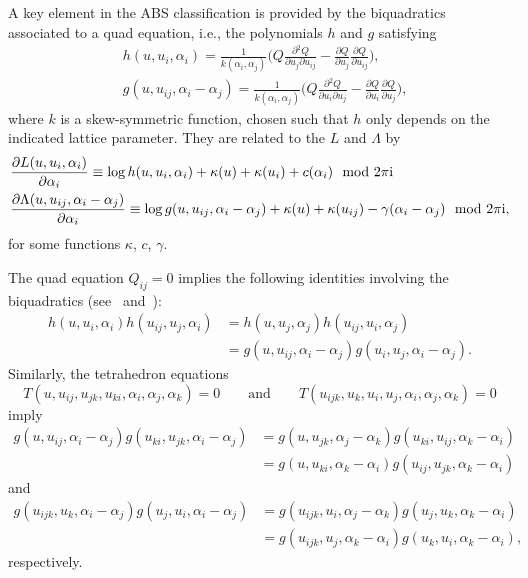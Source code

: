 \documentclass[pdftex]{sigma}
\newcommand{\pdv}[2]{\frac{\partial {#1}}{\partial {#2}}}
\numberwithin{equation}{section}
\begin{document}
A key element in the ABS classification is provided by the biquadratics associated to a quad equation, i.e., the polynomials $h$ and $g$ satisfying
 \begin{align*}
 & h(u,u_i,\alpha_i)= \frac{1}{k(\alpha_i,\alpha_j)} \biggl( Q \pdv{^2 Q}{u_j \partial u_{ij}} - \pdv{Q}{u_j}\pdv{Q}{u_{ij}} \biggr) , \\
 & g(u,u_{ij},\alpha_i-\alpha_j)= \frac{1}{k(\alpha_i,\alpha_j)} \biggl( Q \pdv{^2 Q}{u_i \partial u_j} - \pdv{Q}{u_i}\pdv{Q}{u_j} \biggr) ,
 \end{align*}
 where $k$ is a skew-symmetric function, chosen such that $h$ only depends on the indicated lattice parameter. They are related to the $L$ and $\Lambda$ by
\cite[Lemma 3]{bobenko2010lagrangian}{\samepage
 \begin{align}
	 &\pdv{L(u,u_i,\alpha_i)}{\alpha_i}\equiv \log h(u,u_i,\alpha_i) + \kappa(u) + \kappa(u_i) + c(\alpha_i) \mod 2 \pi {\rm i} \label{L-log(h)}\\
	 &\pdv{\Lambda(u,u_{ij},\alpha_i-\alpha_j)}{\alpha_i}\equiv \log g(u,u_{ij},\alpha_i-\alpha_j) + \kappa(u) + \kappa(u_{ij}) - \gamma(\alpha_i-\alpha_j) \mod 2 \pi {\rm i} , \label{Lambda-log(g)}
 \end{align}
 for some functions $\kappa$, $c$, $\gamma$.}

The quad equation $Q_{ij} = 0$ implies the following identities involving the biquadratics (see~\cite[Lemma 1]{bobenko2010lagrangian} and~\cite[Proposition 15]{adler2003classification}):
\begin{align}
	h(u,u_i,\alpha_i)h(u_{ij},u_j,\alpha_i)
 &= h(u,u_j,\alpha_j)h(u_{ij},u_i,\alpha_j) \nonumber \\
 &= g(u,u_{ij},\alpha_i-\alpha_j)g(u_i,u_j,\alpha_i-\alpha_j) .\label{biquadratric-quad}
\end{align}
Similarly, the tetrahedron equations
\[ T(u,u_{ij},u_{jk},u_{ki},\alpha_i,\alpha_j,\alpha_k)=0 \qquad \text{and} \qquad T(u_{ijk},u_{k},u_{i},u_{j},\alpha_i,\alpha_j,\alpha_k)=0\]
imply
\begin{align}
	g(u,u_{ij},\alpha_i-\alpha_j)g(u_{ki},u_{jk},\alpha_i-\alpha_j) & = g(u,u_{jk},\alpha_j-\alpha_k)g(u_{ki},u_{ij},\alpha_k-\alpha_i) \nonumber \\
	& = g(u,u_{ki},\alpha_k-\alpha_i)g(u_{ij},u_{jk},\alpha_k-\alpha_i)\label{biquadratric-tetra}
\end{align}
and
\begin{align}
	g(u_{ijk},u_{k},\alpha_i-\alpha_j)g(u_{j},u_{i},\alpha_i-\alpha_j) & = g(u_{ijk},u_{i},\alpha_j-\alpha_k)g(u_{j},u_{k},\alpha_k-\alpha_i) \nonumber \\
	& = g(u_{ijk},u_{j},\alpha_k-\alpha_i)g(u_{k},u_{i},\alpha_k-\alpha_i),\label{biquadratric-tetra-inverted}
\end{align}
respectively.
\end{document}
